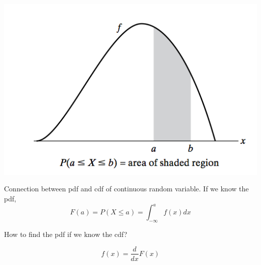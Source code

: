 \documentclass[slidestop,compress,mathserif]{beamer}
\begin{document}
\begin{frame}\frametitle{}
\vspace{-0.5cm}

\begin{center}
\includegraphics[scale = 0.4]{figures/pdf}
\end{center}
\vspace{-0.3cm}


Connection between pdf and cdf of continuous random variable. If we know the pdf,
\[ F(a) = P(X \leq a) =  \int_{-\infty}^{a} f(x) dx \]

How to find the pdf if we know the cdf?


\vspace{-0.3cm}

\[ f(x) = \frac{d}{dx}F(x) \]

\end{frame}
\end{document}
